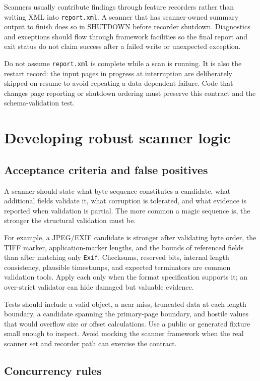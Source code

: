 \documentclass[11pt]{article}
\newcommand{\code}[1]{\texttt{#1}}
\begin{document}
Scanners usually contribute findings through feature recorders rather than
writing XML into \code{report.xml}. A scanner that has scanner-owned summary
output to finish does so in SHUTDOWN before recorder shutdown. Diagnostics and
exceptions should flow through framework facilities so the final report and
exit status do not claim success after a failed write or unexpected exception.

Do not assume \code{report.xml} is complete while a scan is running. It is also
the restart record: the input pages in progress at interruption are deliberately
skipped on resume to avoid repeating a data-dependent failure. Code that
changes page reporting or shutdown ordering must preserve this contract and
the schema-validation test.

\section{Developing robust scanner logic}

\subsection{Acceptance criteria and false positives}

A scanner should state what byte sequence constitutes a candidate, what
additional fields validate it, what corruption is tolerated, and what evidence
is reported when validation is partial. The more common a magic sequence is,
the stronger the structural validation must be.

For example, a JPEG/EXIF candidate is stronger after validating byte order,
the TIFF marker, application-marker lengths, and the bounds of referenced
fields than after matching only \code{Exif}. Checksums, reserved bits, internal
length consistency, plausible timestamps, and expected terminators are common
validation tools. Apply each only when the format specification supports it;
an over-strict validator can hide damaged but valuable evidence.

Tests should include a valid object, a near miss, truncated data at each length
boundary, a candidate spanning the primary-page boundary, and hostile values
that would overflow size or offset calculations. Use a public or generated
fixture small enough to inspect. Avoid mocking the scanner framework when the
real scanner set and recorder path can exercise the contract.

\subsection{Concurrency rules}
\end{document}
